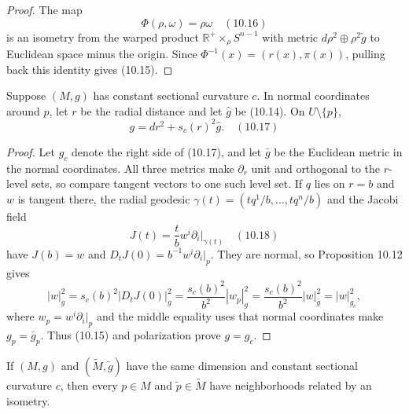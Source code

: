 \begin{proof}
\sketch
The map
\begin{equation}
\Phi(\rho,\omega)=\rho\omega \quad (10.16)
\end{equation}
is an isometry from the warped product
$\mathbb R^+\times_\rho S^{n-1}$ with metric
$d\rho^2\oplus\rho^2\check g$ to Euclidean space minus the origin.  Since
$\Phi^{-1}(x)=(r(x),\pi(x))$, pulling back this identity gives (10.15).
\end{proof}

\begin{theorem}
\label{thm:constant-curvature-normal-coords}
Suppose $(M,g)$ has constant sectional curvature $c$.  In normal coordinates
around $p$, let $r$ be the radial distance and let $\hat g$ be (10.14).  On
$U\setminus\{p\}$,
\begin{equation}
g=dr^2+s_c(r)^2\hat g. \quad (10.17)
\end{equation}
\end{theorem}

\begin{proof}
\sketch
Let $g_c$ denote the right side of (10.17), and let $\bar g$ be the Euclidean
metric in the normal coordinates.  All three metrics make $\partial_r$ unit
and orthogonal to the $r$-level sets, so compare tangent vectors to one such
level set.  If $q$ lies on $r=b$ and $w$ is tangent there, the radial geodesic
$\gamma(t)=(tq^1/b,\ldots,tq^n/b)$ and the Jacobi field
\begin{equation}
J(t)=\frac{t}{b}w^i\partial_i\bigg|_{\gamma(t)} \quad (10.18)
\end{equation}
have $J(b)=w$ and $D_tJ(0)=b^{-1}w^i\partial_i|_p$.  They are normal, so
Proposition 10.12 gives
\[
|w|_g^2=s_c(b)^2|D_tJ(0)|_g^2
=\frac{s_c(b)^2}{b^2}|w_p|_g^2
=\frac{s_c(b)^2}{b^2}|w|_{\bar g}^2
=|w|_{g_c}^2,
\]
where $w_p=w^i\partial_i|_p$ and the middle equality uses that normal
coordinates make $g_p=\bar g_p$.  Thus (10.15) and polarization prove
$g=g_c$.
\end{proof}

\begin{corollary}
\label{cor:local-uniqueness-constant-curvature}
If $(M,g)$ and $(\widetilde M,\widetilde g)$ have the same dimension and
constant sectional curvature $c$, then every $p\in M$ and
$\widetilde p\in\widetilde M$ have neighborhoods related by an isometry.
\end{corollary}

